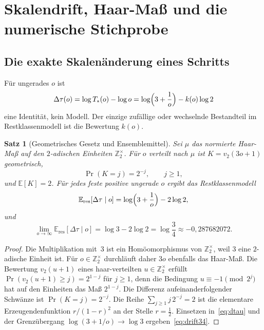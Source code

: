 \documentclass[11pt,a4paper]{article}
\theoremstyle{plain}
\newtheorem{theorem}{Satz}[section]
\theoremstyle{definition}
\newcommand{\Z}{\mathbb{Z}}
\newcommand{\E}{\mathbb{E}}
\numberwithin{equation}{section}
\begin{document}
\section{Skalendrift, Haar-Maß und die numerische Stichprobe}
\label{sec:drift}

\subsection{Die exakte Skalenänderung eines Schritts}

Für ungerades $o$ ist
\begin{equation}
\label{eq:dtau}
\Delta\tau(o)
=\log T_*(o)-\log o
=\log\Bigl(3+\frac1o\Bigr)-k(o)\log 2
\end{equation}
eine Identität, kein Modell.
Der einzige zufällige oder wechselnde Bestandteil im Restklassenmodell ist
die Bewertung $k(o)$.

\begin{theorem}[Geometrisches Gesetz und Ensemblemittel]
\label{thm:haar}
Sei $\mu$ das normierte Haar-Maß auf den $2$-adischen Einheiten $\Z_2^\times$.
Für $o$ verteilt nach $\mu$ ist $K=v_2(3o+1)$ geometrisch,
\begin{equation}
\Pr(K=j)=2^{-j},\qquad j\ge 1,
\end{equation}
und $\E[K]=2$.
Für jedes feste positive ungerade $o$ ergibt das Restklassenmodell
\begin{equation}
\E_{\mathrm{res}}[\Delta\tau\mid o]
=\log\Bigl(3+\frac1o\Bigr)-2\log 2,
\end{equation}
und
\begin{equation}
\label{eq:drift34}
\lim_{o\to\infty}\E_{\mathrm{res}}[\Delta\tau\mid o]
=\log 3-2\log 2
=\log\frac34
\approx -0{,}287682072.
\end{equation}
\end{theorem}

\begin{proof}
Die Multiplikation mit~$3$ ist ein Homöomorphismus von $\Z_2^\times$, weil $3$
eine $2$-adische Einheit ist.
Für $o\in\Z_2^\times$ durchläuft daher $3o$ ebenfalls das Haar-Maß.
Die Bewertung $v_2(u+1)$ eines haar-verteilten $u\in\Z_2^\times$ erfüllt
$\Pr(v_2(u+1)\ge j)=2^{1-j}$ für $j\ge 1$, denn die Bedingung
$u\equiv -1\pmod{2^j}$ hat auf den Einheiten das Maß $2^{1-j}$.
Die Differenz aufeinanderfolgender Schwänze ist $\Pr(K=j)=2^{-j}$.
Die Reihe $\sum_{j\ge 1} j\,2^{-j}=2$ ist die elementare Erzeugendenfunktion
$r/(1-r)^2$ an der Stelle $r=\tfrac12$.
Einsetzen in~\eqref{eq:dtau} und der Grenzübergang
$\log(3+1/o)\to\log 3$ ergeben~\eqref{eq:drift34}.
\end{proof}
\end{document}
